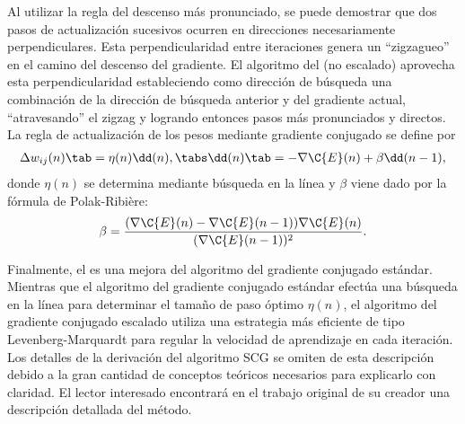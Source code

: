 Al utilizar la regla del descenso más pronunciado, se puede demostrar
que dos pasos de actualización sucesivos ocurren en direcciones
necesariamente perpendiculares.
Esta perpendicularidad entre iteraciones genera un ``zigzagueo'' en el
camino del descenso del gradiente. El algoritmo del  (no escalado) aprovecha esta perpendicularidad
estableciendo como dirección de búsqueda una combinación de la
dirección de búsqueda anterior y del gradiente actual, ``atravesando''
el zigzag y logrando entonces pasos más pronunciados y directos.
La regla de actualización de los pesos mediante gradiente conjugado
se define por
%
\begin{align}\label{e2:delta-rule-conjugate}
  \Delta w_{ij}(n)\tab=\eta(n)\dd(n),
  \tabs \dd(n)\tab=-\nabla{\C{E}(n)}+\beta\dd(n-1),
\end{align}
%
donde $\eta(n)$ se determina mediante búsqueda en la línea y
$\beta$ viene dado por la fórmula de Polak-Ribière:
%
\begin{align}\label{e2:polak-ribiere}
  \beta=
  \frac{(\nabla{\C{E}(n)}-\nabla{\C{E}(n-1)})\nabla{\C{E}(n)}}{(\nabla{\C{E}(n-1)})^2}.
\end{align}
%


Finalmente, el  es una
mejora del algoritmo del gradiente conjugado estándar.  Mientras que
el algoritmo del gradiente conjugado estándar efectúa una búsqueda en
la línea para determinar el tamaño de paso óptimo $\eta(n)$, el
algoritmo del gradiente conjugado escalado utiliza una estrategia más
eficiente de tipo Levenberg-Marquardt para regular la velocidad de
aprendizaje en cada iteración.
Los detalles de la derivación del algoritmo SCG se omiten de esta
descripción debido a la gran cantidad de conceptos teóricos necesarios
para explicarlo con claridad. El lector interesado encontrará en el
trabajo original de su creador \cite{scg} una descripción detallada
del método.
